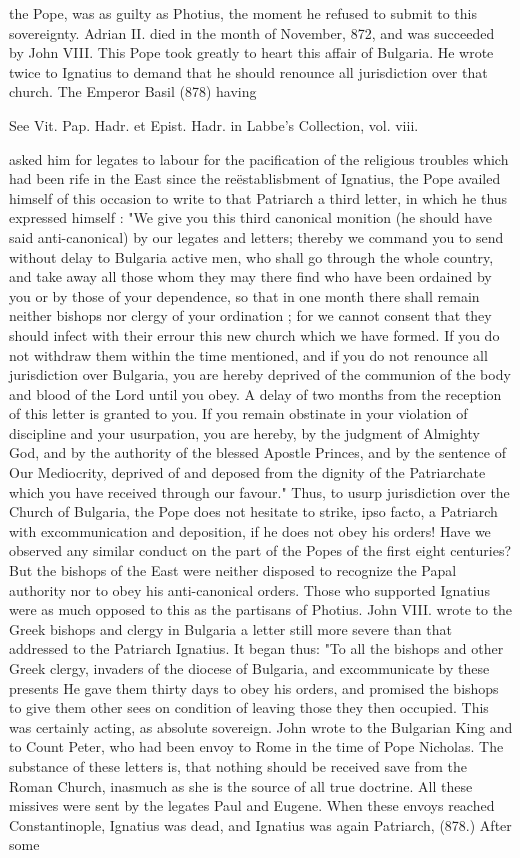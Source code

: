 the Pope, was as guilty as Photius, the moment he refused to submit to this sovereignty. Adrian II. died in the month of November, 872, and was succeeded by John VIII. This Pope took greatly to heart this affair of Bulgaria. He wrote twice to Ignatius to demand that he should renounce all jurisdiction over that church. The Emperor Basil (878) having

See Vit. Pap. Hadr. et Epist. Hadr. in Labbe’s Collection, vol. viii.

asked him for legates to labour for the pacification of the religious troubles which had been rife in the East since the reëstablisbment of Ignatius, the Pope availed himself of this occasion to write to that Patriarch a third letter, in which he thus expressed himself : "We give you this third canonical monition (he should have said anti-canonical) by our legates and letters; thereby we command you to send without delay to Bulgaria active men, who shall go through the whole country, and take away all those whom they may there find who have been ordained by you or by those of your dependence, so that in one month there shall remain neither bishops nor clergy of your ordination ; for we cannot consent that they should infect with their errour this new church which we have formed. If you do not withdraw them within the time mentioned, and if you do not renounce all jurisdiction over Bulgaria, you are hereby deprived of the communion of the body and blood of the Lord until you obey. A delay of two months from the reception of this letter is granted to you. If you remain obstinate in your violation of discipline and your usurpation, you are hereby, by the judgment of Almighty God, and by the authority of the blessed Apostle Princes, and by the sentence of Our Mediocrity, deprived of and deposed from the dignity of the Patriarchate which you have received through our favour." Thus, to usurp jurisdiction over the Church of Bulgaria, the Pope does not hesitate to strike, ipso facto, a Patriarch with excommunication and deposition, if he does not obey his orders! Have we observed any similar conduct on the part of the Popes of the first eight centuries? But the bishops of the East were neither disposed to recognize the Papal authority nor to obey his anti-canonical orders. Those who supported Ignatius were as much opposed to this as the partisans of Photius. John VIII. wrote to the Greek bishops and clergy in Bulgaria a letter still more severe than that addressed to the Patriarch Ignatius. It began thus: "To all the bishops and other Greek clergy, invaders of the diocese of Bulgaria, and excommunicate by these presents He gave them thirty days to obey his orders, and promised the bishops to give them other sees on condition of leaving those they then occupied. This was certainly acting, as absolute sovereign. John wrote to the Bulgarian King and to Count Peter, who had been envoy to Rome in the time of Pope Nicholas. The substance of these letters is, that nothing should be received save from the Roman Church, inasmuch as she is the source of all true doctrine. All these missives were sent by the legates Paul and Eugene. When these envoys reached Constantinople, Ignatius was dead, and Ignatius was again Patriarch, (878.) After some 